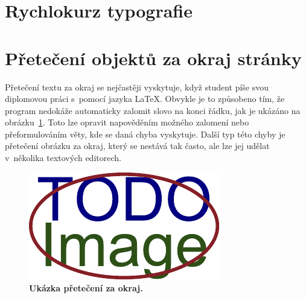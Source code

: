 \section{Rychlokurz typografie}
\DummyText


\section{Přetečení objektů za okraj stránky}
Přetečení textu za okraj se nejčastěji vyskytuje, když student píše svou diplomovou
práci s~pomocí jazyka {\LaTeX}. Obvykle je to způsobeno tím, že program nedokáže
automaticky zalomit slovo na konci řádku, jak je ukázáno na
obrázku~\ref{pic_overflow}. Toto lze opravit napověděním možného
zalomení nebo přeformulováním věty, kde se daná chyba vyskytuje.
Další typ této chyby je přetečení obrázku za okraj,
který se nestává tak často, ale lze jej udělat v~několika textových editorech.

\begin{figure}[H]
    \label{pic_overflow}
    \centering
    \includegraphics{obrazky-figures/placeholder.pdf}
    \caption{\textbf{Ukázka přetečení za okraj.} }
\end{figure}


